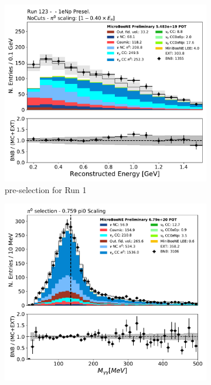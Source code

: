 \begin{figure}[H] 
\begin{center}
    \begin{subfigure}[b]{0.3\textwidth}
    \centering
    \includegraphics[width=1.00\textwidth]{1eNp/reco_e_presel.pdf}
    \caption{\label{fig:datamccomparisons:nuepresel} \npsel pre-selection for Run  1}
    \end{subfigure}
    \begin{subfigure}[b]{0.3\textwidth}
    \centering
    \includegraphics[width=1.00\textwidth]{pi0/calorimetry/pi0_mass_Y_corr_run123.pdf}

\end{subfigure}
\end{center}
\end{figure}
